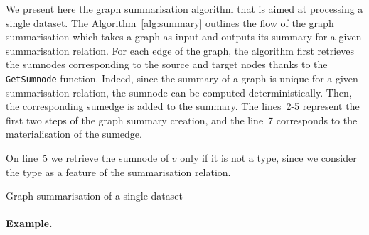 We present here the graph summarisation algorithm that is aimed at processing a single dataset.
The Algorithm~\ref{alg:summary} outlines the flow of the graph summarisation which takes a graph as input and outputs its summary for a given summarisation relation. For each edge of the graph, the algorithm first retrieves the sumnodes corresponding to the source and target nodes thanks to the \texttt{GetSumnode} function. Indeed, since the summary of a graph is unique for a given summarisation relation, the sumnode can be computed deterministically. Then, the corresponding sumedge is added to the summary. The lines~2-5 represent the first two steps of the graph summary creation, and the line~7 corresponds to the materialisation of the sumedge.

\begin{remark}
On line~5 we retrieve the sumnode of $v$ only if it is not a type, since we consider the type as a feature of the summarisation relation.
\end{remark}

%	

\begin{algorithm}
	\DontPrintSemicolon
	\BlankLine
	\caption{Graph summarisation of a single dataset}
	\label{alg:summary}
\end{algorithm}

\paragraph{Example.}

